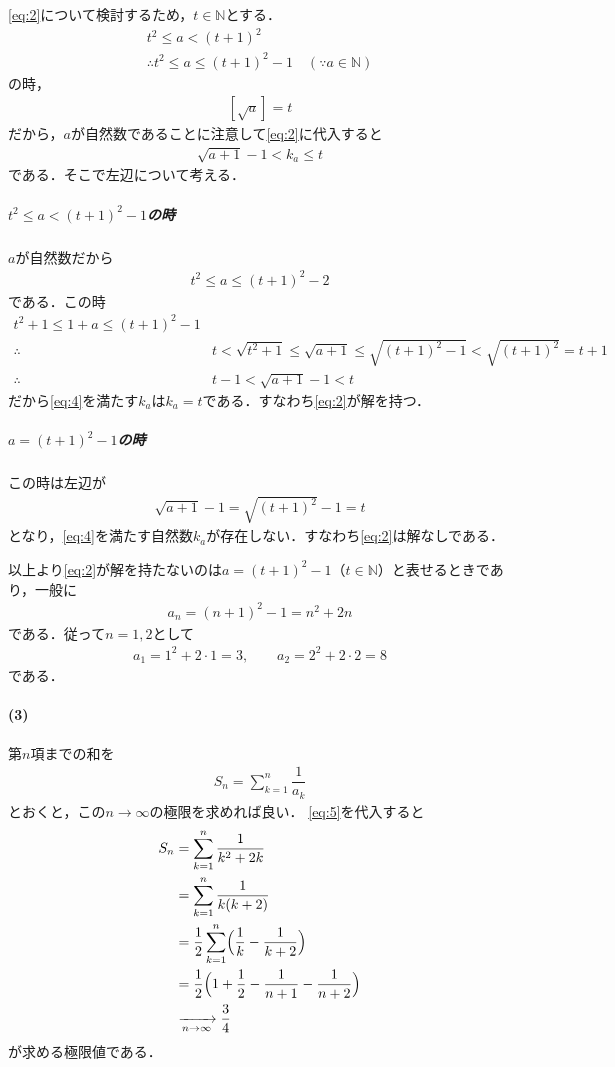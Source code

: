 \documentclass[../../main.tex]{subfiles}
\begin{document}
\cref{eq:2}について検討するため，$t\in\mathbb N$とする．
\begin{align}
  t^2 \le a < (t+1)^2 \\
  \therefore
  t^2 \le a \le (t+1)^2-1 \quad (\because a \in\mathbb{N})
\end{align}
の時，
\begin{align}
  \left[\sqrt{a}\right] = t \label{eq:3}
\end{align}
だから，$a$が自然数であることに注意して\cref{eq:2}に代入すると
\begin{align}
  \sqrt{a+1}-1 < k_a \le t \label{eq:4}
\end{align}
である．そこで左辺について考える．

\subparagraph{$t^2 \le a < (t+1)^2-1$の時}

$a$が自然数だから
\begin{align}
  t^2 \le a \le (t+1)^2-2
\end{align}
である．この時
\begin{align}
  t^2+1 \le 1+a \le (t+1)^2-1 \\
  \therefore
  & t < \sqrt{t^2+1} \le \sqrt{a+1} \le \sqrt{(t+1)^2-1} < \sqrt{(t+1)^2} = t+1 \\
  \therefore
  & t-1 < \sqrt{a+1}-1 < t
\end{align}
だから\cref{eq:4}を満たす$k_a$は$k_a=t$である．すなわち\cref{eq:2}が解を持つ．

\subparagraph{$a=(t+1)^2-1$の時}

この時は左辺が
\begin{align}
  \sqrt{a+1}-1 = \sqrt{(t+1)^2}-1 = t
\end{align}
となり，\cref{eq:4}を満たす自然数$k_a$が存在しない．すなわち\cref{eq:2}は解なしである．
\casesend

以上より\cref{eq:2}が解を持たないのは$a=(t+1)^2-1$（$t\in\mathbb N$）と表せるときであり，一般に
\begin{align}
  a_n=(n+1)^2-1 = n^2+2n \label{eq:5}
\end{align}
である．従って$n=1,2$として
\begin{align}
  a_1=1^2+2\cdot1=3,\qquad a_2=2^2+2\cdot2=8
\end{align}
である．

\paragraph{(3)}

第$n$項までの和を
\begin{align}
  S_n=\sum_{k=1}^n\dfrac{1}{a_k} \label{eq:6}
\end{align}
とおくと，この$n\to\infty$の極限を求めれば良い．
\cref{eq:5}を代入すると
\begin{align}
  S_n
  &=\sum_{k=1}^n\dfrac{1}{k^2+2k} \\
  &=\sum_{k=1}^n\dfrac{1}{k(k+2)} \\
  &=\dfrac{1}{2}\sum_{k=1}^n\Bigl(\dfrac{1}{k}-\dfrac{1}{k+2}\Bigr) \\
  &=\dfrac{1}{2}\Bigl(1+\dfrac{1}{2}-\dfrac{1}{n+1}-\dfrac{1}{n+2}\Bigr) \\
  &\xrightarrow[n\to\infty]{} \dfrac{3}{4}
\end{align}
が求める極限値である．

\newpage
\end{document}
